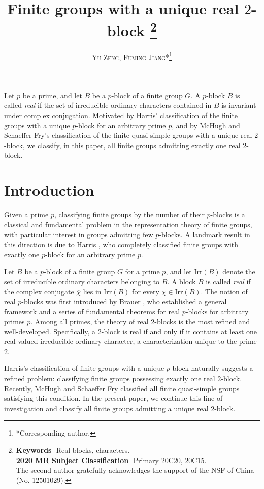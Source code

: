 \documentclass[10pt]{article}
\title{Finite groups with a unique real $2$-block
\thanks{\textbf{Keywords}\,\, Real blocks, characters.\\
\textbf{2020 MR Subject Classification}\,\, Primary 20C20, 20C15.\\
 The second author gratefully acknowledges the support of the NSF of China (No. 12501029).
}}
\author{\textsc{Yu Zeng}, \textsc{Fuming Jiang}*\thanks{*Corresponding author.}\\
}
\date{}
\makeatletter
\renewcommand{\contentsname}{\small\bfseries Contents}
\newcommand{\centeredtitle}[1]{%
  \begin{center}
    {\small\bfseries #1}%
  \end{center}
  \vspace{1ex}%
}
\renewcommand{\tableofcontents}{%
    \centeredtitle{\contentsname}%
    \@starttoc{toc}%
  }%
\renewenvironment{abstract}{%
  \centeredtitle{\abstractname}%
  \vspace{-0.6\baselineskip}%
  \quotation
}{%
  \endquotation
}
\makeatother
\begin{document}
\maketitle




\begin{abstract}
  Let $p$ be a prime, and let $B$ be a $p$-block of a finite group $G$.
  A $p$-block $B$ is called \emph{real} if the set of irreducible ordinary characters contained in $B$ 
  is invariant under complex conjugation.
  Motivated by Harris' classification of the finite groups with a unique $p$-block for an arbitrary prime $p$,
  and by McHugh and Schaeffer Fry's classification of the finite quasi-simple groups with a unique real $2$-block,
  we classify, in this paper, all finite groups admitting exactly one real $2$-block.
\end{abstract}



\section{Introduction}


Given a prime $p$, classifying finite groups by the number of their $p$-blocks is a classical and fundamental problem in the representation theory of finite groups, with particular interest in groups admitting few $p$-blocks.
A landmark result in this direction is due to Harris \cite{harris85}, who completely classified finite groups with exactly one $p$-block for an arbitrary prime $p$.


Let $B$ be a $p$-block of a finite group $G$ for a prime $p$, and let $\mathrm{Irr}(B)$ denote the set of irreducible ordinary characters belonging to $B$.
 A block $B$ is called \emph{real} if the complex conjugate $\overline{\chi}$ lies in $\mathrm{Irr}(B)$ for every $\chi\in\mathrm{Irr}(B)$. 
 The notion of real $p$-blocks was first introduced by Brauer \cite[Page 518]{brauer71}, who established a general framework and a series of fundamental theorems for real $p$-blocks for arbitrary primes $p$. 
 Among all primes, the theory of real $2$-blocks is the most refined and well-developed. 
 Specifically, a $2$-block is real if and only if it contains at least one real-valued irreducible ordinary character, a characterization unique to the prime $2$.



Harris's classification of finite groups with a unique $p$-block naturally suggests a refined problem: classifying finite groups possessing exactly one real $2$-block. 
Recently, McHugh and Schaeffer Fry \cite{mchugh26} classified all finite quasi-simple groups satisfying this condition.
In the present paper, we continue this line of investigation and classify all finite groups admitting a unique real $2$-block.
\end{document}
